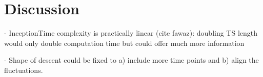 \section{Discussion}
- InceptionTime complexity is practically linear (cite fawaz): doubling TS length would only double computation time but could offer much more information

- Shape of descent could be fixed to a) include more time points and b) align the fluctuations.